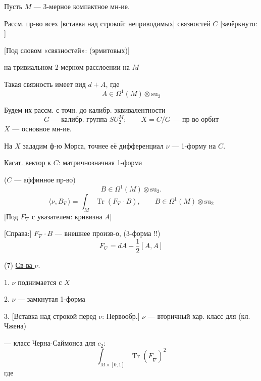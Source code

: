 Пусть $M$ — 3-мерное компактное мн-ие.

Рассм. пр-во всех [вставка над строкой: неприводимых] связностей $C$
[зачёркнуто: ]

[Под словом «связностей»: (эрмитовых)]

на тривиальном 2-мерном расслоении на $M$

Такая связность имеет вид $d+A$, где
\begin{equation*}
A\in\Omega^1(M)\otimes\mathrm{su}_2
\end{equation*}

Будем их рассм. с точн. до калибр. эквивалентности
\begin{equation*}
G\text{ — калибр. группа }SU_2^M;\qquad
X=C/G\text{ — пр-во орбит}
\end{equation*}
$X$ — основное мн-ие.

На $X$ зададим ф-ю Морса, точнее её дифференциал
$\nu$ — 1-форму на $C$.

\underline{Касат. вектор к $C$}: матричнозначная 1-форма

($C$ — аффинное пр-во)
\begin{equation*}
B\in\Omega^1(M)\otimes\mathrm{su}_2.
\end{equation*}
\begin{equation*}
\langle\nu,B_\nabla\rangle
=\int_M\operatorname{Tr}(F_\nabla\cdot B),
\qquad B\in\Omega^1(M)\otimes\mathrm{su}_2
\tag{5}
\end{equation*}
[Под $F_\nabla$ с указателем: кривизна $A$]

[Справа:] $F_\nabla\cdot B$ — внешнее произв-о, (3-форма !!)
\begin{equation*}
F_\nabla=dA+\frac{1}{2}[A,A]
\tag{6}
\end{equation*}


(7) \underline{Св-ва $\nu$}.

1. $\nu$ поднимается с $X$

2. $\nu$ — замкнутая 1-форма

3. [Вставка над строкой перед $\nu$: Первообр.] $\nu$ — вторичный хар. класс для
 (кл. Чжена)

— класс Черна-Саймонса для $c_2$:
\begin{equation*}
\int_{M\times[0,1]}\operatorname{Tr}(F_{\widetilde\nabla})^2
\tag{8}
\end{equation*}
где

